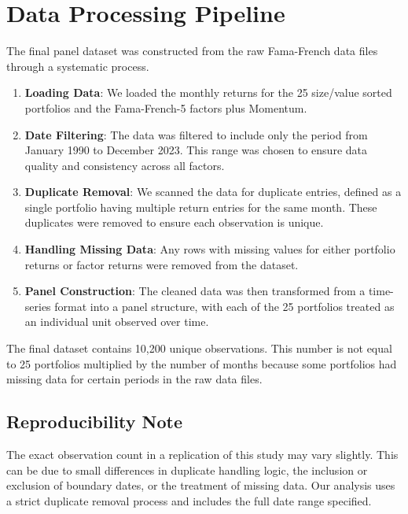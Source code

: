 \section*{Data Processing Pipeline}
The final panel dataset was constructed from the raw Fama-French data files through a systematic process.
\begin{enumerate}
    \item \textbf{Loading Data}: We loaded the monthly returns for the 25 size/value sorted portfolios and the Fama-French-5 factors plus Momentum.
    \item \textbf{Date Filtering}: The data was filtered to include only the period from January 1990 to December 2023. This range was chosen to ensure data quality and consistency across all factors.
    \item \textbf{Duplicate Removal}: We scanned the data for duplicate entries, defined as a single portfolio having multiple return entries for the same month. These duplicates were removed to ensure each observation is unique.
    \item \textbf{Handling Missing Data}: Any rows with missing values for either portfolio returns or factor returns were removed from the dataset.
    \item \textbf{Panel Construction}: The cleaned data was then transformed from a time-series format into a panel structure, with each of the 25 portfolios treated as an individual unit observed over time.
\end{enumerate}
The final dataset contains 10,200 unique observations. This number is not equal to 25 portfolios multiplied by the number of months because some portfolios had missing data for certain periods in the raw data files.

\subsection*{Reproducibility Note}
The exact observation count in a replication of this study may vary slightly. This can be due to small differences in duplicate handling logic, the inclusion or exclusion of boundary dates, or the treatment of missing data. Our analysis uses a strict duplicate removal process and includes the full date range specified.

